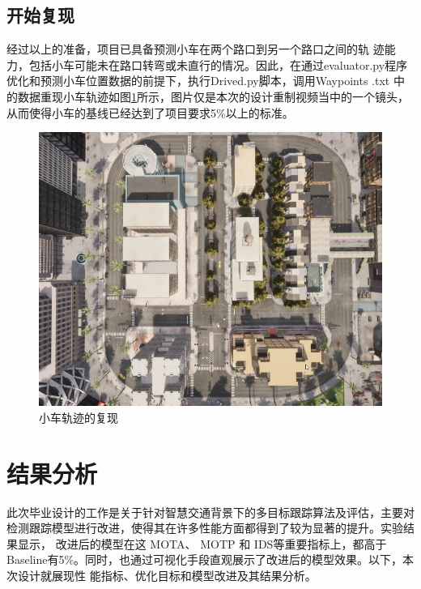 \subsection{开始复现}

经过以上的准备，项目已具备预测小车在两个路口到另一个路口之间的轨 迹能力，包括小车可能未在路口转弯或未直行的情况。因此，在通过evaluator.py程序优化和预测小车位置数据的前提下，执行Drived.py脚本，调用Waypoints .txt 中的数据重现小车轨迹如图\ref{fig:p43}所示，图片仅是本次的设计重制视频当中的一个镜头，从而使得小车的基线已经达到了项目要求5\%以上的标准。


\begin{figure}[htbp] %
	\centering
	\includegraphics[width=1\textwidth]{p43} %
	\caption{小车轨迹的复现} %
	\label{fig:p43} %
\end{figure}






\section{结果分析}

此次毕业设计的工作是关于针对智慧交通背景下的多目标跟踪算法及评估，主要对检测跟踪模型进行改进，使得其在许多性能方面都得到了较为显著的提升。实验结果显示， 改进后的模型在这 MOTA、 MOTP 和 IDS等重要指标上，都高于Baseline有5\%。同时，也通过可视化手段直观展示了改进后的模型效果。以下，本次设计就展现性 能指标、优化目标和模型改进及其结果分析。








